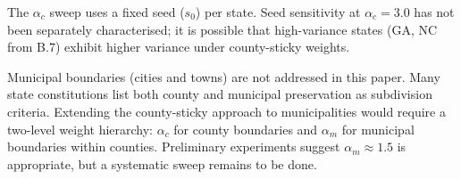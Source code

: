 The $\alpha_c$ sweep uses a fixed seed ($s_0$) per state.  Seed sensitivity
at $\alpha_c = 3.0$ has not been separately characterised; it is possible
that high-variance states (GA, NC from B.7) exhibit higher variance under
county-sticky weights.

Municipal boundaries (cities and towns) are not addressed in this paper.
Many state constitutions list both county and municipal preservation
as subdivision criteria.  Extending the county-sticky approach to
municipalities would require a two-level weight hierarchy:
$\alpha_c$ for county boundaries and $\alpha_m$ for municipal boundaries
within counties.  Preliminary experiments suggest $\alpha_m \approx 1.5$
is appropriate, but a systematic sweep remains to be done.
